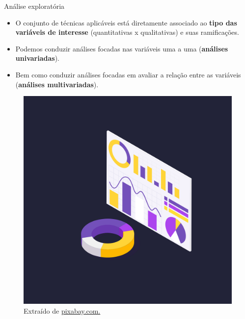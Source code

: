 \documentclass[
  ignorenonframetext,
  serif,
  professionalfont,
  usenames,
  dvipsnames,
  aspectratio = 169]{beamer}
\def\beginAHalfColumn{\begin{minipage}{0.49\textwidth}}%
\def\endColumns{\end{minipage}}%
\begin{document}
\begin{frame}{Análise exploratória}
\protect\hypertarget{anuxe1lise-exploratuxf3ria-2}{}
\beginAHalfColumn

\begin{itemize}
\item
  O conjunto de técnicas aplicáveis está diretamente associado ao
  \textbf{tipo das variáveis de interesse} (quantitativas x
  qualitativas) e suas ramificações.
\item
  Podemos conduzir análises focadas nas variáveis uma a uma
  (\textbf{análises univariadas}).
\item
  Bem como conduzir análises focadas em avaliar a relação entre as
  variáveis (\textbf{análises multivariadas}).
\end{itemize}

\endColumns
\beginAHalfColumn

\begin{figure}

{\centering \includegraphics[width=0.8\linewidth]{./img/exploratoria} 

}

\caption{Extraído de \href{https://cdn.pixabay.com/photo/2020/08/03/10/00/graph-5459708_1280.png}{pixabay.com.}}\label{fig:unnamed-chunk-3}
\end{figure}

\endColumns
\end{frame}
\end{document}
